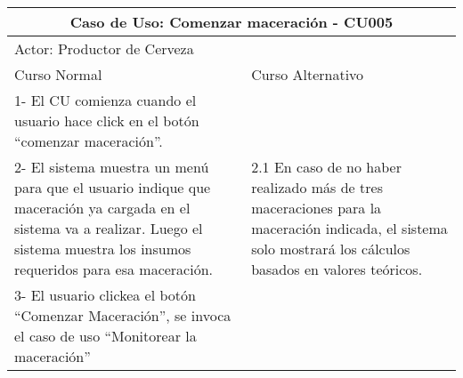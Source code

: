     
    \begin{minipage}{0.95\textwidth}
    \begin{center}
    \begin{tabularx}{\textwidth}{ | X | X |}
        \hline
        \multicolumn{2}{|c|}{\textbf{Caso de Uso: Comenzar maceración - CU005}} \\
        \hline
        \multicolumn{2}{|l|}{Actor: Productor de Cerveza} \\
        \hline
        Curso Normal & Curso Alternativo \\
        \hline
        1- El CU comienza cuando el usuario hace click en el botón “comenzar maceración”. & \\
        \hline
        2- El sistema muestra un menú para que el usuario indique que maceración ya cargada en el sistema va a realizar. Luego el sistema muestra los insumos requeridos para esa maceración. & 2.1 En caso de no haber realizado más de tres maceraciones para la maceración indicada, el sistema solo mostrará los cálculos basados en valores teóricos.
        \\
        \hline
        3- El usuario clickea el botón “Comenzar Maceración”, se invoca el caso de uso “Monitorear la maceración” & 
        \\
        \hline
    \end{tabularx}
    \label{CU005}
    \end{center}
    \end{minipage}
    
